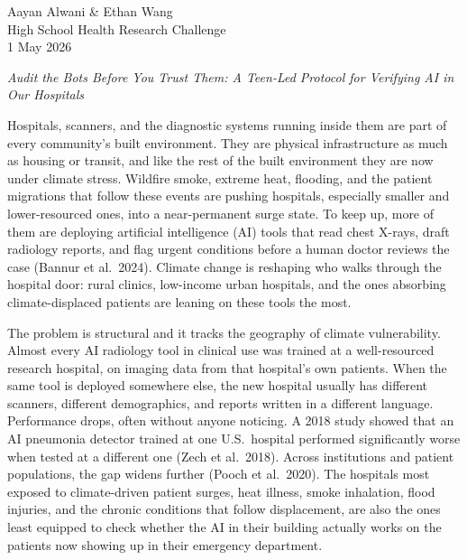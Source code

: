 \documentclass[12pt,letterpaper]{article}
\begin{document}
\noindent
Aayan Alwani \& Ethan Wang\\
High School Health Research Challenge\\
1 May 2026

\vspace{1em}

\begin{center}
\textit{Audit the Bots Before You Trust Them: A Teen-Led Protocol for Verifying AI in Our Hospitals}
\end{center}

\vspace{0.5em}

Hospitals, scanners, and the diagnostic systems running inside them are part of every community's built environment. They are physical infrastructure as much as housing or transit, and like the rest of the built environment they are now under climate stress. Wildfire smoke, extreme heat, flooding, and the patient migrations that follow these events are pushing hospitals, especially smaller and lower-resourced ones, into a near-permanent surge state. To keep up, more of them are deploying artificial intelligence (AI) tools that read chest X-rays, draft radiology reports, and flag urgent conditions before a human doctor reviews the case (Bannur et al.\ 2024). Climate change is reshaping who walks through the hospital door: rural clinics, low-income urban hospitals, and the ones absorbing climate-displaced patients are leaning on these tools the most.

The problem is structural and it tracks the geography of climate vulnerability. Almost every AI radiology tool in clinical use was trained at a well-resourced research hospital, on imaging data from that hospital's own patients. When the same tool is deployed somewhere else, the new hospital usually has different scanners, different demographics, and reports written in a different language. Performance drops, often without anyone noticing. A 2018 study showed that an AI pneumonia detector trained at one U.S.\ hospital performed significantly worse when tested at a different one (Zech et al.\ 2018). Across institutions and patient populations, the gap widens further (Pooch et al.\ 2020). The hospitals most exposed to climate-driven patient surges, heat illness, smoke inhalation, flood injuries, and the chronic conditions that follow displacement, are also the ones least equipped to check whether the AI in their building actually works on the patients now showing up in their emergency department.
\end{document}
